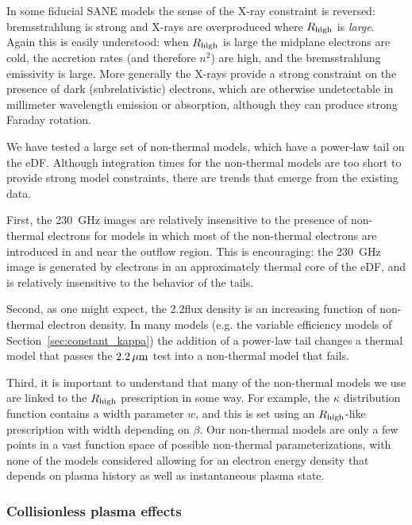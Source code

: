 In some fiducial SANE models the sense of the X-ray constraint is reversed: bremsstrahlung is strong and X-rays are overproduced where $R_\mathrm{high}$ is {\em large}.
Again this is easily understood: when $R_\mathrm{high}$ is large the midplane electrons are cold, the accretion rates (and therefore $n^2$) are high, and the bremsstrahlung emissivity is large.
More generally the X-rays provide a strong constraint on the presence of dark (subrelativistic) electrons, which are otherwise undetectable in millimeter wavelength emission or absorption, although they can produce strong Faraday rotation.

We have tested a large set of non-thermal models, which have a power-law tail on the eDF.
Although integration times for the non-thermal models are too short to provide strong model constraints, there are trends that emerge from the existing data.

First, the 230~GHz images are relatively insensitive to the presence of non-thermal electrons for models in which most of the non-thermal electrons are introduced in and near the outflow region.
This is encouraging: the 230~GHz image is generated by electrons in an approximately thermal core of the eDF, and is relatively insensitive to the behavior of the tails.

Second, as one might expect, the 2.2\um flux density is an increasing function of non-thermal electron density.
In many models (e.g. the variable efficiency models of Section~\ref{sec:constant_kappa}) the addition of a power-law tail changes a thermal model that passes the $2.2\,\mu\mathrm{m}$ test into a non-thermal model that fails.

Third, it is important to understand that many of the non-thermal models we use are linked to the $R_\mathrm{high}$ prescription in some way.
For example, the $\kappa$ distribution function contains a width parameter $w$, and this is set using an $R_\mathrm{high}$-like prescription with width depending on $\beta$.
Our non-thermal models are only a few points in a vast function space of possible non-thermal parameterizations, with none of the models considered allowing for an electron energy density that depends on plasma history as well as instantaneous plasma state.

\subsubsection{Collisionless plasma effects}

